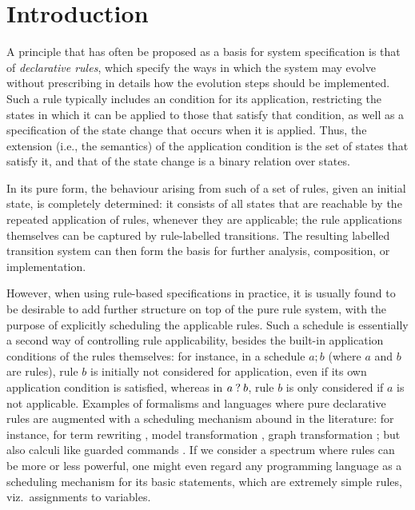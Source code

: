 \section{Introduction}
\label{sec:intro}

A principle that has often be proposed as a basis for system specification is that of \emph{declarative rules}, which specify the ways in which the system may evolve without prescribing in details how the evolution steps should be implemented. Such a rule typically includes an condition for its application, restricting the states in which it can be applied to those that satisfy that condition, as well as a specification of the state change that occurs when it is applied. Thus, the extension (i.e., the semantics) of the application condition is the set of states that satisfy it, and that of the state change is a binary relation over states.

In its pure form, the behaviour arising from such of a set of rules, given an initial state, is completely determined: it consists of all states that are reachable by the repeated application of rules, whenever they are applicable; the rule applications themselves can be captured by rule-labelled transitions. The resulting labelled transition system can then form the basis for further analysis, composition, or implementation.

However, when using rule-based specifications in practice, it is usually found to be desirable to add further structure on top of the pure rule system, with the purpose of explicitly scheduling the applicable rules. Such a schedule is essentially a second way of controlling rule applicability, besides the built-in application conditions of the rules themselves: for instance, in a schedule $a;b$ (where $a$ and $b$ are rules), rule $b$ is initially not considered for application, even if its own application condition is satisfied, whereas in $a\mathbin{?} b$, rule $b$ is only considered if $a$ is not applicable. Examples of formalisms and languages where pure declarative rules are augmented with a scheduling mechanism abound in the literature: for instance, for term rewriting \cite{Spoofax,Maude}, model transformation \cite{QVT}, graph transformation \cite{GG}; but also calculi like guarded commands \cite{GC,ChandyMisra}. If we consider a spectrum where rules can be more or less powerful, one might even regard any programming language as a scheduling mechanism for its basic statements, which are extremely simple rules, viz.\ assignments to variables.

